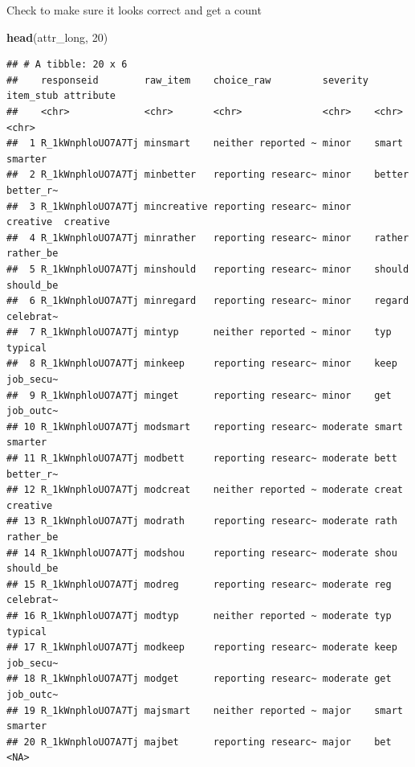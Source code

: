 \documentclass[
]{article}
\newenvironment{Shaded}{\begin{snugshade}}{\end{snugshade}}
\newcommand{\AttributeTok}[1]{\textcolor[rgb]{0.13,0.29,0.53}{#1}}
\newcommand{\DecValTok}[1]{\textcolor[rgb]{0.00,0.00,0.81}{#1}}
\newcommand{\FunctionTok}[1]{\textcolor[rgb]{0.13,0.29,0.53}{\textbf{#1}}}
\newcommand{\NormalTok}[1]{#1}
\newcommand{\SpecialCharTok}[1]{\textcolor[rgb]{0.81,0.36,0.00}{\textbf{#1}}}
\newcommand{\StringTok}[1]{\textcolor[rgb]{0.31,0.60,0.02}{#1}}
\begin{document}
Check to make sure it looks correct and get a count

\begin{Shaded}
\begin{Highlighting}[]
\FunctionTok{head}\NormalTok{(attr\_long, }\DecValTok{20}\NormalTok{)}
\end{Highlighting}
\end{Shaded}

\begin{verbatim}
## # A tibble: 20 x 6
##    responseid        raw_item    choice_raw         severity item_stub attribute
##    <chr>             <chr>       <chr>              <chr>    <chr>     <chr>    
##  1 R_1kWnphloUO7A7Tj minsmart    neither reported ~ minor    smart     smarter  
##  2 R_1kWnphloUO7A7Tj minbetter   reporting researc~ minor    better    better_r~
##  3 R_1kWnphloUO7A7Tj mincreative reporting researc~ minor    creative  creative 
##  4 R_1kWnphloUO7A7Tj minrather   reporting researc~ minor    rather    rather_be
##  5 R_1kWnphloUO7A7Tj minshould   reporting researc~ minor    should    should_be
##  6 R_1kWnphloUO7A7Tj minregard   reporting researc~ minor    regard    celebrat~
##  7 R_1kWnphloUO7A7Tj mintyp      neither reported ~ minor    typ       typical  
##  8 R_1kWnphloUO7A7Tj minkeep     reporting researc~ minor    keep      job_secu~
##  9 R_1kWnphloUO7A7Tj minget      reporting researc~ minor    get       job_outc~
## 10 R_1kWnphloUO7A7Tj modsmart    reporting researc~ moderate smart     smarter  
## 11 R_1kWnphloUO7A7Tj modbett     reporting researc~ moderate bett      better_r~
## 12 R_1kWnphloUO7A7Tj modcreat    neither reported ~ moderate creat     creative 
## 13 R_1kWnphloUO7A7Tj modrath     reporting researc~ moderate rath      rather_be
## 14 R_1kWnphloUO7A7Tj modshou     reporting researc~ moderate shou      should_be
## 15 R_1kWnphloUO7A7Tj modreg      reporting researc~ moderate reg       celebrat~
## 16 R_1kWnphloUO7A7Tj modtyp      neither reported ~ moderate typ       typical  
## 17 R_1kWnphloUO7A7Tj modkeep     reporting researc~ moderate keep      job_secu~
## 18 R_1kWnphloUO7A7Tj modget      reporting researc~ moderate get       job_outc~
## 19 R_1kWnphloUO7A7Tj majsmart    neither reported ~ major    smart     smarter  
## 20 R_1kWnphloUO7A7Tj majbet      reporting researc~ major    bet       <NA>
\end{verbatim}

\begin{Shaded}
\end{Shaded}
\end{document}
